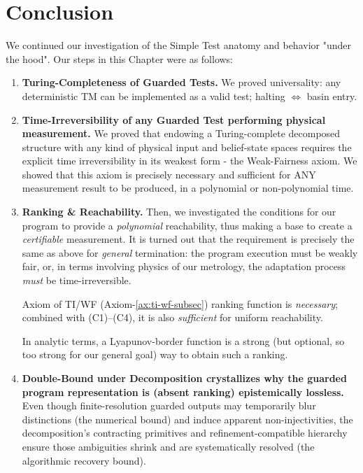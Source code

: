 \documentclass[12pt]{article}
\theoremstyle{definition}
\theoremstyle{plain}
\begin{document}
\section{Conclusion}
We continued our investigation of the Simple Test anatomy and behavior "under the hood". Our steps in this Chapter were as follows:
\begin{enumerate}
    
  \item \textbf{Turing-Completeness of Guarded Tests.}  
        We proved universality: any deterministic TM can be implemented as a valid test; halting $\iff$ basin entry.  
  \item \textbf{Time-Irreversibility of any Guarded Test performing physical measurement.} We proved that endowing a Turing-complete decomposed structure with any kind of physical input and belief-state spaces requires the explicit time irreversibility in its weakest form - the Weak-Fairness axiom. We showed that this axiom is precisely necessary and sufficient for ANY measurement result to be produced, in a polynomial or non-polynomial time. 
  \item \textbf{Ranking \& Reachability.}  
        Then, we investigated the conditions for our program to provide a \emph{polynomial} reachability, thus making a base to create a \emph{certifiable} measurement. It is turned out that the requirement is precisely the same as above for \emph{general} termination: the program execution must be weakly fair, or, in terms involving physics of our metrology, the adaptation process \emph{must} be time-irreversible.      
        
        Axiom of TI/WF (Axiom-\ref{ax:ti-wf-subsec}) ranking function is \emph{necessary}; combined with (C1)–(C4), it is also \emph{sufficient} for uniform reachability.  
        
        In analytic terms, a Lyapunov-border function is a strong (but optional, so too strong for our general goal) way to obtain such a ranking.
        \item \textbf{Double-Bound under Decomposition crystallizes why the guarded program representation is (absent ranking) epistemically lossless.} Even though finite-resolution guarded outputs may temporarily blur distinctions (the numerical bound) and induce apparent non-injectivities, the decomposition’s contracting primitives and refinement-compatible hierarchy ensure those ambiguities shrink and are systematically resolved (the algorithmic recovery bound). 
        

\end{enumerate}
\end{document}

